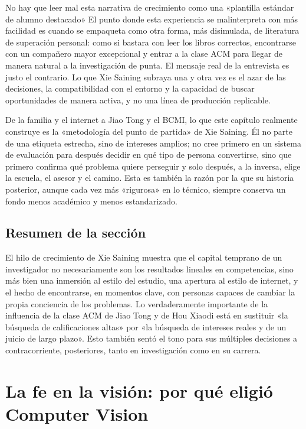 \documentclass[a4paper,12pt]{article}
\begin{document}
\begin{warningbox}{No hay que leer mal esta narrativa de crecimiento como una «plantilla estándar de alumno destacado»}
El punto donde esta experiencia se malinterpreta con más facilidad es cuando se empaqueta como otra forma, más disimulada, de literatura de superación personal: como si bastara con leer los libros correctos, encontrarse con un compañero mayor excepcional y entrar a la clase ACM para llegar de manera natural a la investigación de punta. El mensaje real de la entrevista es justo el contrario. Lo que Xie Saining subraya una y otra vez es el azar de las decisiones, la compatibilidad con el entorno y la capacidad de buscar oportunidades de manera activa, y no una línea de producción replicable.
\end{warningbox}

De la familia y el internet a Jiao Tong y el BCMI, lo que este capítulo realmente construye es la «metodología del punto de partida» de Xie Saining. Él no parte de una etiqueta estrecha, sino de intereses amplios; no cree primero en un sistema de evaluación para después decidir en qué tipo de persona convertirse, sino que primero confirma qué problema quiere perseguir y solo después, a la inversa, elige la escuela, el asesor y el camino. Esta es también la razón por la que su historia posterior, aunque cada vez más «rigurosa» en lo técnico, siempre conserva un fondo menos académico y menos estandarizado.

\subsection{Resumen de la sección}

El hilo de crecimiento de Xie Saining muestra que el capital temprano de un investigador no necesariamente son los resultados lineales en competencias, sino más bien una inmersión al estilo del estudio, una apertura al estilo de internet, y el hecho de encontrarse, en momentos clave, con personas capaces de cambiar la propia conciencia de los problemas. Lo verdaderamente importante de la influencia de la clase ACM de Jiao Tong y de Hou Xiaodi está en sustituir «la búsqueda de calificaciones altas» por «la búsqueda de intereses reales y de un juicio de largo plazo». Esto también sentó el tono para sus múltiples decisiones a contracorriente, posteriores, tanto en investigación como en su carrera.
\section{La fe en la visión: por qué eligió Computer Vision}
\end{document}
